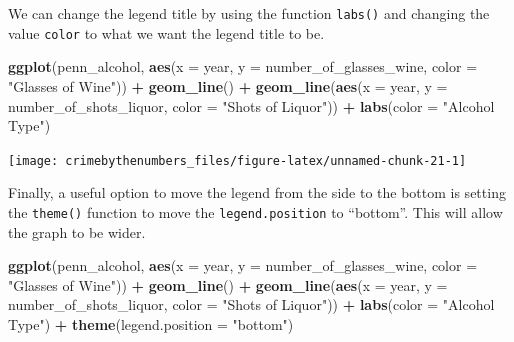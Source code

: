 \documentclass[
  12pt,
]{book}
\newenvironment{Shaded}{\begin{snugshade}}{\end{snugshade}}
\newcommand{\DataTypeTok}[1]{\textcolor[rgb]{0.27,0.27,0.27}{#1}}
\newcommand{\KeywordTok}[1]{\textcolor[rgb]{0.27,0.27,0.27}{\textbf{#1}}}
\newcommand{\NormalTok}[1]{#1}
\newcommand{\OperatorTok}[1]{\textcolor[rgb]{0.43,0.43,0.43}{\textbf{#1}}}
\newcommand{\StringTok}[1]{\textcolor[rgb]{0.5,0.5,0.5}{#1}}
\begin{document}
We can change the legend title by using the function \texttt{labs()} and changing the value \texttt{color} to what we want the legend title to be.

\begin{Shaded}
\begin{Highlighting}[]
\KeywordTok{ggplot}\NormalTok{(penn\_alcohol, }\KeywordTok{aes}\NormalTok{(}\DataTypeTok{x =}\NormalTok{ year, }\DataTypeTok{y =}\NormalTok{ number\_of\_glasses\_wine,}
                         \DataTypeTok{color =} \StringTok{"Glasses of Wine"}\NormalTok{)) }\OperatorTok{+}
\StringTok{  }\KeywordTok{geom\_line}\NormalTok{() }\OperatorTok{+}
\StringTok{  }\KeywordTok{geom\_line}\NormalTok{(}\KeywordTok{aes}\NormalTok{(}\DataTypeTok{x =}\NormalTok{ year, }\DataTypeTok{y =}\NormalTok{ number\_of\_shots\_liquor,}
                \DataTypeTok{color =} \StringTok{"Shots of Liquor"}\NormalTok{)) }\OperatorTok{+}
\StringTok{  }\KeywordTok{labs}\NormalTok{(}\DataTypeTok{color =} \StringTok{"Alcohol Type"}\NormalTok{)}
\end{Highlighting}
\end{Shaded}

\begin{center}\texttt{[image: crimebythenumbers\_files/figure-latex/unnamed-chunk-21-1]} \end{center}

Finally, a useful option to move the legend from the side to the bottom is setting the \texttt{theme()} function to move the \texttt{legend.position} to ``bottom''. This will allow the graph to be wider.

\begin{Shaded}
\begin{Highlighting}[]
\KeywordTok{ggplot}\NormalTok{(penn\_alcohol, }\KeywordTok{aes}\NormalTok{(}\DataTypeTok{x =}\NormalTok{ year, }\DataTypeTok{y =}\NormalTok{ number\_of\_glasses\_wine,}
                         \DataTypeTok{color =} \StringTok{"Glasses of Wine"}\NormalTok{)) }\OperatorTok{+}
\StringTok{  }\KeywordTok{geom\_line}\NormalTok{() }\OperatorTok{+}
\StringTok{  }\KeywordTok{geom\_line}\NormalTok{(}\KeywordTok{aes}\NormalTok{(}\DataTypeTok{x =}\NormalTok{ year, }\DataTypeTok{y =}\NormalTok{ number\_of\_shots\_liquor,}
                \DataTypeTok{color =} \StringTok{"Shots of Liquor"}\NormalTok{)) }\OperatorTok{+}
\StringTok{  }\KeywordTok{labs}\NormalTok{(}\DataTypeTok{color =} \StringTok{"Alcohol Type"}\NormalTok{) }\OperatorTok{+}
\StringTok{  }\KeywordTok{theme}\NormalTok{(}\DataTypeTok{legend.position =} \StringTok{"bottom"}\NormalTok{)}
\end{Highlighting}
\end{Shaded}
\end{document}
